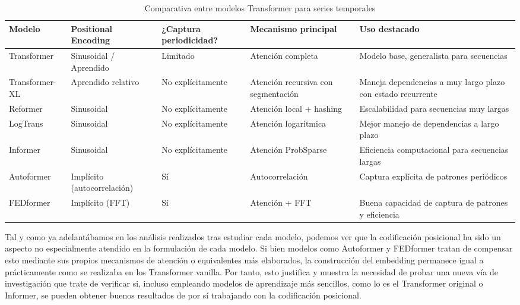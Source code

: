 {\begin{table}[H]
    \centering
    \begingroup
    \renewcommand{\arraystretch}{1.15}
    \begin{tabular}{P{2.25cm} | P{2cm} P{2cm} P{3cm} P{3.2cm}}
        \toprule
        \textbf{Modelo} & \textbf{Positional Encoding} & \textbf{¿Captura periodicidad?} & \textbf{Mecanismo principal} & \textbf{Uso destacado} \\
        \midrule
        Transformer     & Sinusoidal / Aprendido       & Limitado                        & Atención completa                   & Modelo base, generalista para secuencias                    \\
        Transformer-XL  & Aprendido relativo           & No explícitamente               & Atención recursiva con segmentación & Maneja dependencias a muy largo plazo con estado recurrente \\
        Reformer        & Sinusoidal                   & No explícitamente               & Atención local + hashing            & Escalabilidad para secuencias muy largas                    \\
        LogTrans        & Sinusoidal                   & No explícitamente               & Atención logarítmica                & Mejor manejo de dependencias a largo plazo                  \\
        Informer        & Sinusoidal                   & No explícitamente               & Atención ProbSparse                 & Eficiencia computacional para secuencias largas             \\
        Autoformer      & Implícito (autocorrelación)  & Sí                              & Autocorrelación                     & Captura explícita de patrones periódicos                    \\
        FEDformer       & Implícito (FFT)              & Sí                              & Atención + FFT                      & Buena capacidad de captura de patrones y eficiencia         \\
        \bottomrule
    \end{tabular}
    \caption{Comparativa entre modelos Transformer para series temporales}
    \label{resumenmodelos}
    \endgroup
\end{table}

Tal y como ya adelantábamos en los análisis realizados tras estudiar cada modelo, podemos ver que la codificación posicional ha sido un aspecto no especialmente atendido en la formulación de cada modelo. Si bien modelos como Autoformer y FEDformer tratan de compensar esto mediante sus propios mecanismos de atención o equivalentes más elaborados, la construcción del embedding permanece igual a prácticamente como se realizaba en los Transformer vanilla. Por tanto, esto justifica y muestra la necesidad de probar una nueva vía de investigación que trate de verificar si, incluso empleando modelos de aprendizaje más sencillos, como lo es el Transformer original o Informer, se pueden obtener buenos resultados de por sí trabajando con la codificación posicional.\\

}
